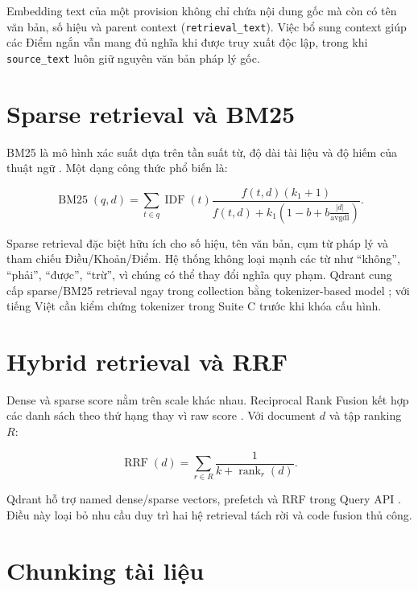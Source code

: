 \documentclass[a4paper,12pt]{extreport}
\newcommand{\code}[1]{\texttt{#1}}
\begin{document}
Embedding text của một provision không chỉ chứa nội dung gốc mà còn có tên văn bản, số hiệu và parent context (\code{retrieval\_text}). Việc bổ sung context giúp các Điểm ngắn vẫn mang đủ nghĩa khi được truy xuất độc lập, trong khi \code{source\_text} luôn giữ nguyên văn bản pháp lý gốc.

\section{Sparse retrieval và BM25}

BM25 là mô hình xác suất dựa trên tần suất từ, độ dài tài liệu và độ hiếm của thuật ngữ \cite{robertson2009bm25}. Một dạng công thức phổ biến là:

\begin{equation}
\operatorname{BM25}(q,d)=\sum_{t\in q}\operatorname{IDF}(t)
\frac{f(t,d)(k_1+1)}{f(t,d)+k_1\left(1-b+b\frac{|d|}{\operatorname{avgdl}}\right)}.
\end{equation}

Sparse retrieval đặc biệt hữu ích cho số hiệu, tên văn bản, cụm từ pháp lý và tham chiếu Điều/Khoản/Điểm. Hệ thống không loại mạnh các từ như ``không'', ``phải'', ``được'', ``trừ'', vì chúng có thể thay đổi nghĩa quy phạm. Qdrant cung cấp sparse/BM25 retrieval ngay trong collection bằng tokenizer-based model \cite{qdrant2026bm25}; với tiếng Việt cần kiểm chứng tokenizer trong Suite C trước khi khóa cấu hình.

\section{Hybrid retrieval và RRF}

Dense và sparse score nằm trên scale khác nhau. Reciprocal Rank Fusion kết hợp các danh sách theo thứ hạng thay vì raw score \cite{cormack2009rrf}. Với document $d$ và tập ranking $R$:

\begin{equation}
\operatorname{RRF}(d)=\sum_{r\in R}\frac{1}{k+\operatorname{rank}_r(d)}.
\end{equation}

Qdrant hỗ trợ named dense/sparse vectors, prefetch và RRF trong Query API \cite{qdrant2026hybrid}. Điều này loại bỏ nhu cầu duy trì hai hệ retrieval tách rời và code fusion thủ công.

\section{Chunking tài liệu}
\end{document}
